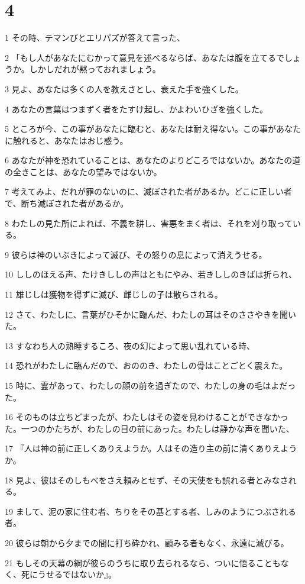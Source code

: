 \chapter{4}

\par 1 その時、テマンびとエリパズが答えて言った、
\par 2 「もし人があなたにむかって意見を述べるならば、あなたは腹を立てるでしょうか。しかしだれが黙っておれましょう。
\par 3 見よ、あなたは多くの人を教えさとし、衰えた手を強くした。
\par 4 あなたの言葉はつまずく者をたすけ起し、かよわいひざを強くした。
\par 5 ところが今、この事があなたに臨むと、あなたは耐え得ない。この事があなたに触れると、あなたはおじ惑う。
\par 6 あなたが神を恐れていることは、あなたのよりどころではないか。あなたの道の全きことは、あなたの望みではないか。
\par 7 考えてみよ、だれが罪のないのに、滅ぼされた者があるか。どこに正しい者で、断ち滅ぼされた者があるか。
\par 8 わたしの見た所によれば、不義を耕し、害悪をまく者は、それを刈り取っている。
\par 9 彼らは神のいぶきによって滅び、その怒りの息によって消えうせる。
\par 10 ししのほえる声、たけきししの声はともにやみ、若きししのきばは折られ、
\par 11 雄じしは獲物を得ずに滅び、雌じしの子は散らされる。
\par 12 さて、わたしに、言葉がひそかに臨んだ、わたしの耳はそのささやきを聞いた。
\par 13 すなわち人の熟睡するころ、夜の幻によって思い乱れている時、
\par 14 恐れがわたしに臨んだので、おののき、わたしの骨はことごとく震えた。
\par 15 時に、霊があって、わたしの顔の前を過ぎたので、わたしの身の毛はよだった。
\par 16 そのものは立ちどまったが、わたしはその姿を見わけることができなかった。一つのかたちが、わたしの目の前にあった。わたしは静かな声を聞いた、
\par 17 『人は神の前に正しくありえようか。人はその造り主の前に清くありえようか。
\par 18 見よ、彼はそのしもべをさえ頼みとせず、その天使をも誤れる者とみなされる。
\par 19 まして、泥の家に住む者、ちりをその基とする者、しみのようにつぶされる者。
\par 20 彼らは朝から夕までの間に打ち砕かれ、顧みる者もなく、永遠に滅びる。
\par 21 もしその天幕の綱が彼らのうちに取り去られるなら、ついに悟ることもなく、死にうせるではないか』。

